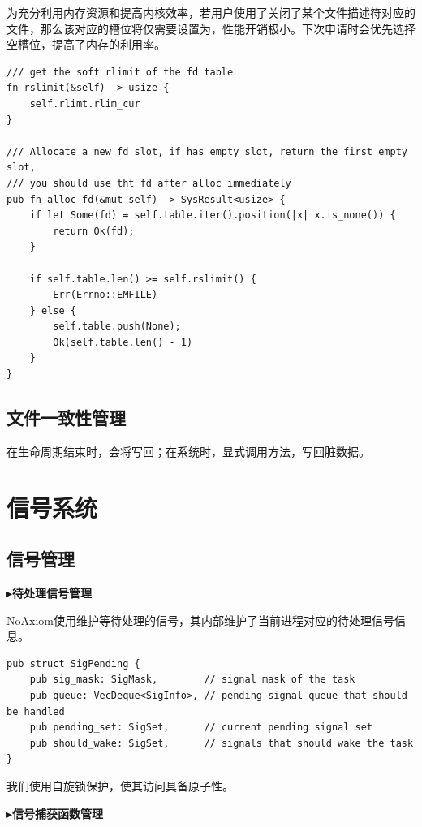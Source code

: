 \documentclass{article}
\begin{document}
为充分利用内存资源和提高内核效率，若用户使用了关闭了某个文件描述符对应的文件，那么该对应的槽位将仅需要设置为，性能开销极小。下次申请时会优先选择空槽位，提高了内存的利用率。

\begin{lstlisting}
/// get the soft rlimit of the fd table
fn rslimit(&self) -> usize {
    self.rlimt.rlim_cur
}

/// Allocate a new fd slot, if has empty slot, return the first empty slot,
/// you should use tht fd after alloc immediately
pub fn alloc_fd(&mut self) -> SysResult<usize> {
    if let Some(fd) = self.table.iter().position(|x| x.is_none()) {
        return Ok(fd);
    }

    if self.table.len() >= self.rslimit() {
        Err(Errno::EMFILE)
    } else {
        self.table.push(None);
        Ok(self.table.len() - 1)
    }
}
\end{lstlisting}

\subsection{文件一致性管理}
在生命周期结束时，会将写回；在系统时，显式调用方法，写回脏数据。

\newpage
\section{信号系统}
\subsection{信号管理}

$\blacktriangleright$\textbf{待处理信号管理}

NoAxiom使用维护等待处理的信号，其内部维护了当前进程对应的待处理信号信息。

\begin{lstlisting}
pub struct SigPending {
    pub sig_mask: SigMask,        // signal mask of the task
    pub queue: VecDeque<SigInfo>, // pending signal queue that should be handled
    pub pending_set: SigSet,      // current pending signal set
    pub should_wake: SigSet,      // signals that should wake the task
}
\end{lstlisting}

我们使用自旋锁保护，使其访问具备原子性。

$\blacktriangleright$\textbf{信号捕获函数管理}
\end{document}
